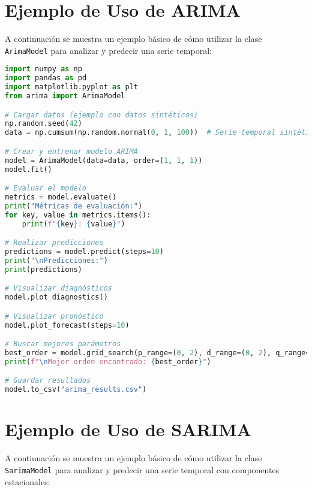 \documentclass[12pt,letterpaper]{report}
\begin{document}
\section{Ejemplo de Uso de ARIMA}
A continuación se muestra un ejemplo básico de cómo utilizar la clase \texttt{ArimaModel} para analizar y predecir una serie temporal:

\begin{lstlisting}[language=python]
import numpy as np
import pandas as pd
import matplotlib.pyplot as plt
from arima import ArimaModel

# Cargar datos (ejemplo con datos sintéticos)
np.random.seed(42)
data = np.cumsum(np.random.normal(0, 1, 100))  # Serie temporal sintética

# Crear y entrenar modelo ARIMA
model = ArimaModel(data=data, order=(1, 1, 1))
model.fit()

# Evaluar el modelo
metrics = model.evaluate()
print("Métricas de evaluación:")
for key, value in metrics.items():
    print(f"{key}: {value}")

# Realizar predicciones
predictions = model.predict(steps=10)
print("\nPredicciones:")
print(predictions)

# Visualizar diagnósticos
model.plot_diagnostics()

# Visualizar pronóstico
model.plot_forecast(steps=10)

# Buscar mejores parámetros
best_order = model.grid_search(p_range=(0, 2), d_range=(0, 2), q_range=(0, 2))
print(f"\nMejor orden encontrado: {best_order}")

# Guardar resultados
model.to_csv("arima_results.csv")
\end{lstlisting}

\section{Ejemplo de Uso de SARIMA}
A continuación se muestra un ejemplo básico de cómo utilizar la clase \texttt{SarimaModel} para analizar y predecir una serie temporal con componentes estacionales:
\end{document}
